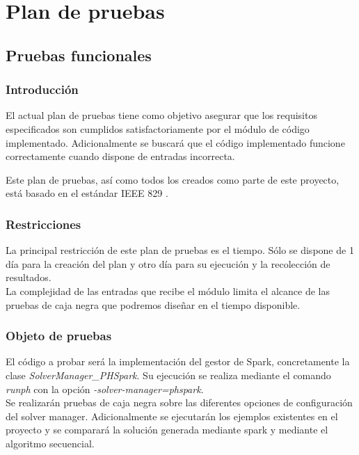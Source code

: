 \chapter{Plan de pruebas}
\label{ch:pruebas}

\section{Pruebas funcionales}

\subsection{Introducción}

El actual plan de pruebas tiene como objetivo asegurar que los requisitos especificados son cumplidos satisfactoriamente por el módulo de código implementado. Adicionalmente se buscará que el código implementado funcione correctamente cuando dispone de entradas incorrecta.

Este plan de pruebas, así como todos los creados como parte de este proyecto, está basado en el estándar IEEE 829 \cite{IEEE829}.

\subsection{Restricciones}

La principal restricción de este plan de pruebas es el tiempo. Sólo se dispone de 1 día para la creación del plan y otro día para su ejecución y la recolección de resultados.\\

La complejidad de las entradas que recibe el módulo limita el alcance de las pruebas de caja negra que podremos diseñar en el tiempo disponible.

\subsection{Objeto de pruebas}

El código a probar será la implementación del gestor de Spark, concretamente la clase {\it SolverManager\_PHSpark}. Su ejecución se realiza mediante el comando {\it runph} con la opción {\it -\-solver-manager=phspark}.\\

Se realizarán pruebas de caja negra sobre las diferentes opciones de configuración del solver manager. Adicionalmente se ejecutarán los ejemplos existentes en el proyecto y se comparará la solución generada mediante spark y mediante el algoritmo secuencial.

